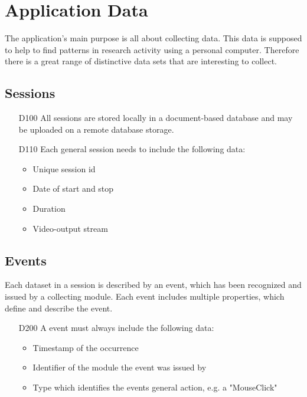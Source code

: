 \chapter{Application Data}
\label{ch:data}

The application's main purpose is all about collecting data. This data is supposed to help to find patterns in research activity using a personal computer. Therefore there is a great range of distinctive data sets that are interesting to collect.

\section{Sessions}
\begin{itemize}

\item[D100] All sessions are stored locally in a document-based database and may be uploaded on a remote database storage.

\item[D110] Each general session needs to include the following data:
	\begin{itemize}
	\item Unique session id
	\item Date of start and stop
	\item Duration
	\item Video-output stream
	\end{itemize}
\end{itemize}

\section{Events}

Each dataset in a session is described by an event, which has been recognized and issued by a collecting module. Each event includes multiple properties, which define and describe the event.

\begin{itemize}
\item[D200] A event must always include the following data:
	\begin{itemize}
	\item Timestamp of the occurrence
	\item Identifier of the module the event was issued by
	\item Type which identifies the events general action, e.g. a "MouseClick"
	\end{itemize}
\end{itemize}

